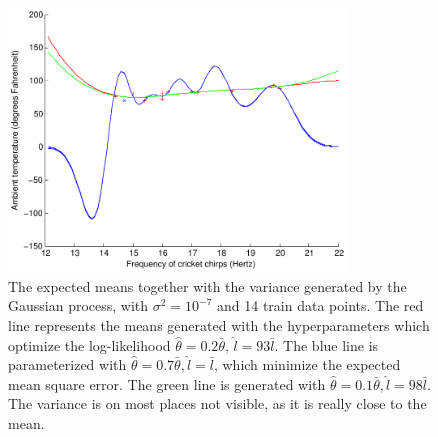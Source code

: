 \documentclass[a4paper,11pt]{article}
\begin{document}
\begin{figure}
  \begin{center}
    \caption{The expected means together with the variance generated by the Gaussian process, with $\sigma^2=10^{-7}$ and 14 train data points.  The red line represents the means generated with the hyperparameters which optimize the log-likelihood $\hat\theta = 0.2\bar\theta$, $\hat l = 93\bar l$.  The blue line is parameterized with $\hat\theta=0.7\bar\theta, \hat l = \bar l$, which minimize the expected mean square error.  The green line is generated with $\hat\theta=0.1\bar\theta, \hat l = 98\bar l$.  The variance is on most places not visible, as it is really close to the mean.}
    \label{fig:ex2plot4s7t1}
    \includegraphics[width=0.8\textwidth]{ex2plot4s7t1}
  \end{center}
\end{figure}
\end{document}
